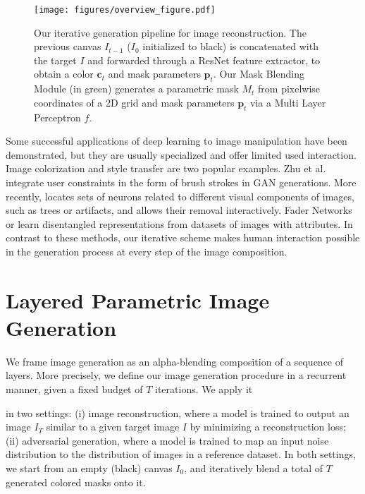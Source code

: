 \documentclass[10pt,twocolumn,letterpaper]{article}
\def\mypar#1{\vspace{1mm}{\bf #1.}\hspace{1mm}}
\begin{document}
\begin{figure*}[t!]
\begin{center}
\texttt{[image: figures/overview\_figure.pdf]}
\end{center}
    \vspace{-3mm}
    \caption{Our iterative generation pipeline for image reconstruction. The previous canvas $I_{t-1}$ ($I_0$ initialized to black) is concatenated with the target $I$ and forwarded through a ResNet feature extractor, to obtain a color $\textbf{c}_t$ and mask parameters $\textbf{p}_t$. 
    Our Mask Blending Module (in green) generates a parametric mask $M_t$ from pixelwise coordinates of a 2D grid and mask parameters $\textbf{p}_t$ via a Multi Layer Perceptron $f$.}
\label{fig:mask_generation_and_blending}
\end{figure*}


\mypar{Image manipulation} 
Some successful applications of deep learning to image manipulation have been demonstrated, but they are usually specialized and offer limited used interaction. Image colorization \cite{zhang2016colorful} and style transfer \cite{Gatys2016ImageStyleTransfer} are two popular examples. Zhu et al. \cite{Zhu2016manipulation} integrate user constraints in the form of brush strokes in GAN generations. More recently, \cite{bau2018gandissect} locates sets of neurons related to different visual components of images, such as trees or artifacts, and allows their removal interactively.
Fader Networks \cite{lample2017fader} or \cite{Mathieu16Disentangling} learn disentangled representations from datasets of images with attributes.  In contrast to these methods, our iterative scheme makes human interaction possible in the generation process at every step of the image composition.


\section{Layered Parametric Image Generation}

We frame image generation as an alpha-blending composition of a sequence of layers.
More precisely, we define our image generation procedure in a recurrent manner, given a fixed budget of $T$ iterations. We apply it  

in two settings: (i) image reconstruction, where a model is trained to output an image $I_{T}$ similar to a given target image $I$ by minimizing a reconstruction loss; (ii) adversarial generation, where a model is trained to map an input noise distribution to the distribution of images in a reference dataset. In both settings, we start from an empty (black) canvas $I_0$, and iteratively blend a total of $T$ generated colored masks onto it.
\end{document}
